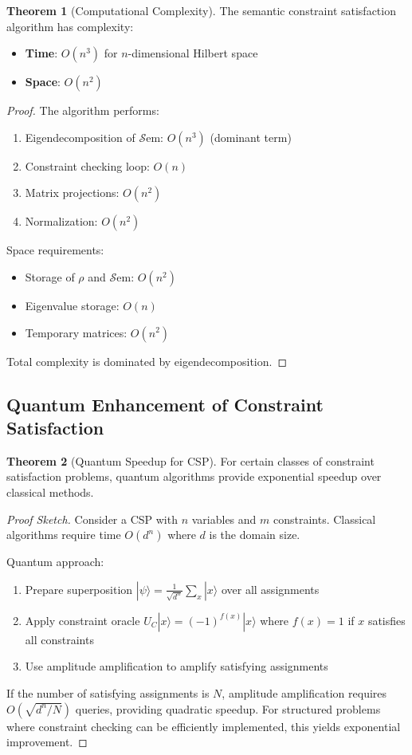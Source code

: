 \documentclass[11pt]{article}
\theoremstyle{definition}
\newtheorem{theorem}{Theorem}[section]
\newcommand{\Sem}{\mathcal{S}\text{em}}
\begin{document}
\begin{theorem}[Computational Complexity]
The semantic constraint satisfaction algorithm has complexity:
\begin{itemize}
\item \textbf{Time}: $O(n^3)$ for $n$-dimensional Hilbert space
\item \textbf{Space}: $O(n^2)$
\end{itemize}
\end{theorem}

\begin{proof}
The algorithm performs:
\begin{enumerate}
\item Eigendecomposition of $\Sem$: $O(n^3)$ (dominant term)
\item Constraint checking loop: $O(n)$
\item Matrix projections: $O(n^2)$
\item Normalization: $O(n^2)$
\end{enumerate}

Space requirements:
\begin{itemize}
\item Storage of $\rho$ and $\Sem$: $O(n^2)$
\item Eigenvalue storage: $O(n)$
\item Temporary matrices: $O(n^2)$
\end{itemize}

Total complexity is dominated by eigendecomposition.
\end{proof}

\subsection{Quantum Enhancement of Constraint Satisfaction}

\begin{theorem}[Quantum Speedup for CSP]
For certain classes of constraint satisfaction problems, quantum algorithms provide exponential speedup over classical methods.
\end{theorem}

\begin{proof}[Proof Sketch]
Consider a CSP with $n$ variables and $m$ constraints. Classical algorithms require time $O(d^n)$ where $d$ is the domain size.

Quantum approach:
\begin{enumerate}
\item Prepare superposition $|\psi\rangle = \frac{1}{\sqrt{d^n}} \sum_{x} |x\rangle$ over all assignments
\item Apply constraint oracle $U_C|x\rangle = (-1)^{f(x)}|x\rangle$ where $f(x) = 1$ if $x$ satisfies all constraints
\item Use amplitude amplification to amplify satisfying assignments
\end{enumerate}

If the number of satisfying assignments is $N$, amplitude amplification requires $O(\sqrt{d^n/N})$ queries, providing quadratic speedup. For structured problems where constraint checking can be efficiently implemented, this yields exponential improvement.
\end{proof}
\end{document}
